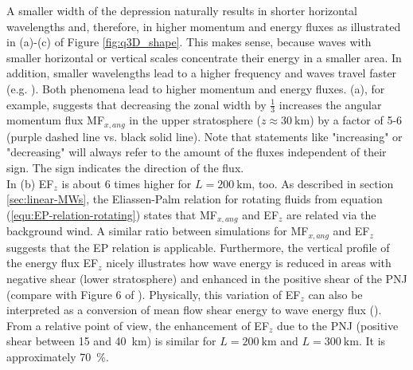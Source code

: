 A smaller width of the depression naturally results in shorter horizontal wavelengths and, therefore, in higher momentum and energy fluxes as illustrated in (a)-(c) of Figure \ref{fig:q3D_shape}. This makes sense, because waves with smaller horizontal or vertical scales concentrate their energy in a smaller area. In addition, smaller wavelengths lead to a higher frequency and waves travel faster (e.g. \cite[]{gill_atmosphere-ocean_1982}). Both phenomena lead to higher momentum and energy fluxes. (a), for example, suggests that decreasing the zonal width by $\frac{1}{3}$ increases the angular momentum flux MF$_{x,ang}$ in the upper stratosphere ($z \approx \SI{30}{\kilo\meter}$) by a factor of 5-6 (purple dashed line vs. black solid line). Note that statements like "increasing" or "decreasing" will always refer to the amount of the fluxes independent of their sign. The sign indicates the direction of the flux. \\
In (b) EF$_z$ is about 6 times higher for $L=\SI{200}{\kilo\meter}$, too. As described in section \ref{sec:linear-MWs}, the Eliassen-Palm relation for rotating fluids from equation (\ref{equ:EP-relation-rotating}) states that MF$_{x,ang}$ and EF$_z$ are related via the background wind. A similar ratio between simulations for MF$_{x,ang}$ and EF$_z$ suggests that the EP relation is applicable. Furthermore, the vertical profile of the energy flux EF$_z$ nicely illustrates how wave energy is reduced in areas with negative shear (lower stratosphere) and enhanced in the positive shear of the PNJ (compare with Figure 6 of \textcite[]{eliassen_transfer_1960}). Physically, this variation of EF$_z$ can also be interpreted as a conversion of mean flow shear energy to wave energy flux (\cite[]{kruse_gravity_2015}). From a relative point of view, the enhancement of EF$_z$ due to the PNJ (positive shear between 15 and \SI{40}{\kilo\meter}) is similar for $L=\SI{200}{\kilo\meter}$ and $L=\SI{300}{\kilo\meter}$. It is approximately \SI{70}{\percent}.

